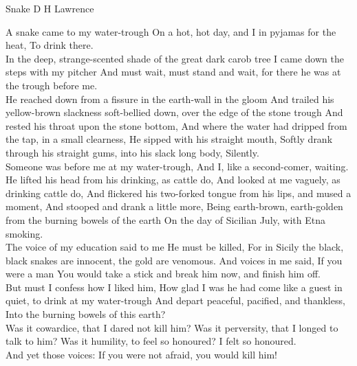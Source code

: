 \begin{poem}
{Snake}
{D H Lawrence}
 
 A snake came to my water-trough
 On a hot, hot day, and I in pyjamas for the heat,
 To drink there.\\
 
 In the deep, strange-scented shade of the great dark carob tree
 I came down the steps with my pitcher
 And must wait, must stand and wait, for there he was at the trough before me.\\
 
 He reached down from a fissure in the earth-wall in the gloom
 And trailed his yellow-brown slackness soft-bellied down, over the 
   edge of the stone trough
 And rested his throat upon the stone bottom,
 And where the water had dripped from the tap, in a small clearness,
 He sipped with his straight mouth,
 Softly drank through his straight gums, into his slack long body,
 Silently.\\
 
 Someone was before me at my water-trough,
 And I, like a second-comer, waiting.\\
 
 He lifted his head from his drinking, as cattle do,
 And looked at me vaguely, as drinking cattle do,
 And flickered his two-forked tongue from his lips, and mused a  moment,
 And stooped and drank a little more,
 Being earth-brown, earth-golden from the burning bowels of the earth
 On the day of Sicilian July, with Etna smoking.\\
 
 The voice of my education said to me
 He must be killed,
 For in Sicily the black, black snakes are innocent, the gold are venomous.
 And voices in me said, If you were a man
 You would take a stick and break him now, and finish him off.\\
 
 But must I confess how I liked him,
 How glad I was he had come like a guest in quiet, to drink at my water-trough
 And depart peaceful, pacified, and thankless,
 Into the burning bowels of this earth?\\
 
 Was it cowardice, that I dared not kill him?
 Was it perversity, that I longed to talk to him?
 Was it humility, to feel so honoured?
 I felt so honoured.\\
 
 And yet those voices:
 If you were not afraid, you would kill him!\\
 

\end{poem}
